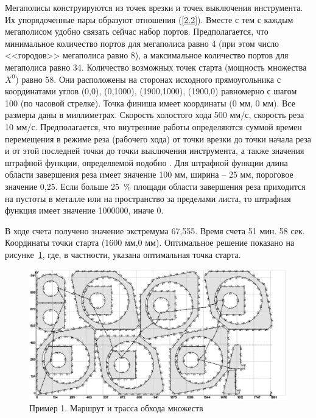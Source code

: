 \documentclass[10pt]{SPIIRAS_Proceedings}
\begin{document}
Мегаполисы конструируются из точек врезки и точек выключения инструмента.
Их упорядоченные пары образуют отношения (\ref{2.2}).
Вместе с тем с каждым мегаполисом удобно связать сейчас набор портов.
Предполагается, что минимальное количество портов для мегаполиса равно 4
(при этом число <<городов>> мегаполиса равно 8),
а максимальное количество портов для мегаполиса равно 34.
Количество возможных точек старта
(мощность множества $X^0$)
равно 58.
Они расположены на сторонах исходного прямоугольника с координатами углов
(0,0), (0,1000), (1900,1000), (1900,0)
равномерно с шагом 100
(по часовой стрелке).
Точка финиша имеет координаты (0 мм, 0 мм).
Все размеры даны в миллиметрах.
Скорость холостого хода 500 мм/с,
скорость реза 10 мм/с.
Предполагается, что внутренние работы определяются
суммой времен перемещения в режиме реза
(рабочего хода)
от точки врезки до точки начала реза
и от этой последней точки до
точки выключения инструмента,
а также значения штрафной функции, определяемой подобно
\cite{18}.
Для штрафной функции длина области завершения реза имеет значение 100 мм,
ширина -- 25 мм,
пороговое значение 0,25.
Если больше 25~\% площади области завершения
реза приходится на пустоты в металле или на пространство за пределами листа,
то штрафная функция имеет значение 1000000, иначе 0.

В ходе счета получено значение экстремума 67,555.
Время счета 51 мин. 58 сек.
Координаты точки старта
(1600 мм,0 мм).
Оптимальное решение показано на рисунке~\ref{fig:1},
где, в частности, указана оптимальная точка старта.


\begin{figure}[h!]
  \centering
  \includegraphics[width=\textwidth]{image.eps}
  \caption{Пример 1. Маршрут и трасса обхода множеств}
  \label{fig:1}
\end{figure}

\printbibliography[title=Литература]
\end{document}
